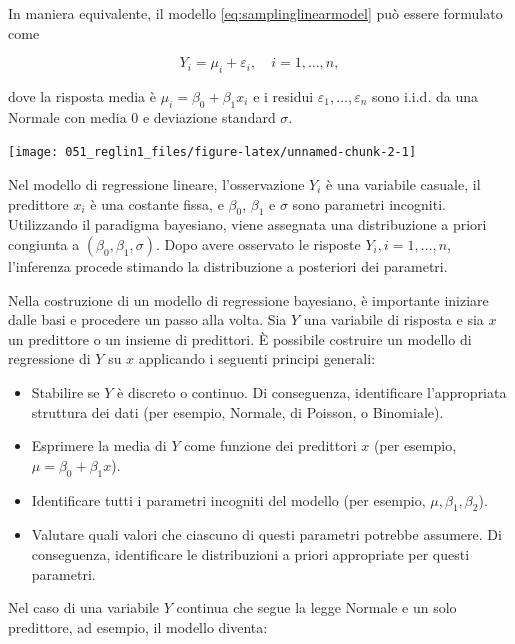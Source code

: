 \documentclass[
]{memoir}
\providecommand{\tightlist}{%
  \setlength{\itemsep}{0pt}\setlength{\parskip}{0pt}}
\begin{document}
In maniera equivalente, il modello \eqref{eq:samplinglinearmodel} può essere formulato come

\begin{equation}
Y_i = \mu_i + \varepsilon_i, \quad i = 1, \dots, n,
\label{eq:samplinglinearmodel2}
\end{equation}

dove la risposta media è \(\mu_i = \beta_0 + \beta_ 1 x_i\) e i residui \(\varepsilon_1, \dots, \varepsilon_n\) sono i.i.d. da una Normale con media 0 e deviazione standard \(\sigma\).

\begin{center}\texttt{[image: 051\_reglin1\_files/figure-latex/unnamed-chunk-2-1]} \end{center}

Nel modello di regressione lineare, l'osservazione \(Y_i\) è una variabile casuale, il predittore \(x_i\) è una costante fissa, e \(\beta_0\), \(\beta_1\) e \(\sigma\) sono parametri incogniti. Utilizzando il paradigma bayesiano, viene assegnata una distribuzione a priori congiunta a \((\beta_0, \beta_1, \sigma)\). Dopo avere osservato le risposte \(Y_i, i = 1, \dots, n\), l'inferenza procede stimando la distribuzione a posteriori dei parametri.

Nella costruzione di un modello di regressione bayesiano, è importante iniziare dalle basi e procedere un passo alla volta. Sia \(Y\) una variabile di risposta e
sia \(x\) un predittore o un insieme di predittori. È possibile costruire un modello di regressione di \(Y\) su \(x\) applicando i seguenti principi generali:

\begin{itemize}
\tightlist
\item
  Stabilire se \(Y\) è discreto o continuo. Di conseguenza, identificare l'appropriata struttura dei dati (per esempio, Normale, di Poisson, o Binomiale).
\item
  Esprimere la media di \(Y\) come funzione dei predittori \(x\) (per esempio, \(\mu = \beta_0 + \beta_1 x\)).
\item
  Identificare tutti i parametri incogniti del modello (per esempio, \(\mu, \beta_1, \beta_2\)).
\item
  Valutare quali valori che ciascuno di questi parametri potrebbe assumere. Di conseguenza, identificare le distribuzioni a priori appropriate per questi parametri.
\end{itemize}

Nel caso di una variabile \(Y\) continua che segue la legge Normale e un solo predittore, ad esempio, il modello diventa:
\end{document}
